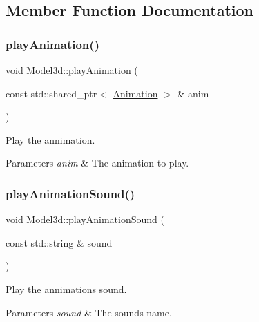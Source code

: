 \subsection{Member Function Documentation}
\mbox{\label{classModel3d_a108ab9c13b7ae24cc1711c2e97fbc625}} 
\subsubsection{\texorpdfstring{play\+Animation()}{playAnimation()}}
{\footnotesize\ttfamily void Model3d\+::play\+Animation (\begin{DoxyParamCaption}\item[{const std\+::shared\+\_\+ptr$<$ \hyperlink{structModel3d_1_1Animation}{Animation} $>$ \&}]{anim }\end{DoxyParamCaption})}



Play the annimation. 


\begin{DoxyParams}{Parameters}
{\em anim} & The animation to play. \\
\hline
\end{DoxyParams}
\mbox{\label{classModel3d_a6ce79286c43bd4a6852c544bdad8ee18}} 
\subsubsection{\texorpdfstring{play\+Animation\+Sound()}{playAnimationSound()}}
{\footnotesize\ttfamily void Model3d\+::play\+Animation\+Sound (\begin{DoxyParamCaption}\item[{const std\+::string \&}]{sound }\end{DoxyParamCaption})}



Play the annimation\textquotesingle{}s sound. 


\begin{DoxyParams}{Parameters}
{\em sound} & The sound\textquotesingle{}s name. \\
\hline
\end{DoxyParams}
\mbox{\label{classModel3d_a40ce7d80e574541b402f646ea31f29cd}} 
